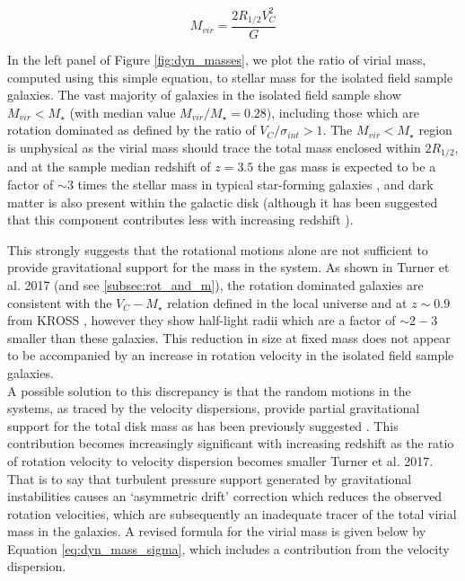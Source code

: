 \documentclass[a4paper,fleqn,usenatbib]{mn2e}
\begin{document}
\begin{equation}\label{eq:dyn_mass_kds}
   M_{vir} = \frac{2R_{1/2}V_{C}^{2}}{G}
\end{equation}

In the left panel of Figure \ref{fig:dyn_masses}, we plot the ratio of virial mass, computed using this simple equation, to stellar mass for the isolated field sample galaxies.
The vast majority of galaxies in the isolated field sample show $M_{vir} < M_{\star}$ (with median value $M_{vir}/M_{\star}=0.28$), including those which are rotation dominated as defined by the ratio of $V_{C}/\sigma_{int} > 1$.
The $M_{vir} < M_{\star}$ region is unphysical as the virial mass should trace the total mass enclosed within $2R_{1/2}$, and at the sample median redshift of $z=3.5$ the gas mass is expected to be a factor of $\sim3$ times the stellar mass in typical star-forming galaxies \citep{Tacconi2013,Tacconi2017}, and dark matter is also present within the galactic disk (although it has been suggested that this component contributes less with increasing redshift \citealt{Ubler2017,Genzel2017,Lang2017}).

This strongly suggests that the rotational motions alone are not sufficient to provide gravitational support for the mass in the system.
As shown in Turner et al. 2017 (and see \cref{subsec:rot_and_m}), the rotation dominated galaxies are consistent with the $V_{C}-M_{\star}$ relation defined in the local universe and at $z\sim0.9$ from KROSS \citep{Harrison2017}, however they show half-light radii which are a factor of $\sim2-3$ smaller than these galaxies.
This reduction in size at fixed mass does not appear to be accompanied by an increase in rotation velocity in the isolated field sample galaxies. \\

A possible solution to this discrepancy is that the random motions in the systems, as traced by the velocity dispersions, provide partial gravitational support for the total disk mass as has been previously suggested \citep[e.g.][]{Burkert2010,Newman2013,Ubler2017}.
This contribution becomes increasingly significant with increasing redshift as the ratio of rotation velocity to velocity dispersion becomes smaller \citep[e.g.][]{ForsterSchreiber2009,Law2009,Epinat2012,Stott2016} Turner et al. 2017.
That is to say that turbulent pressure support generated by gravitational instabilities causes an `asymmetric drift' correction \citep[e.g.][]{Burkert2010} which reduces the observed rotation velocities, which are subsequently an inadequate tracer of the total virial mass in the galaxies.
A revised formula for the virial mass is given below by Equation \ref{eq:dyn_mass_sigma}, which includes a contribution from the velocity dispersion.
\end{document}
